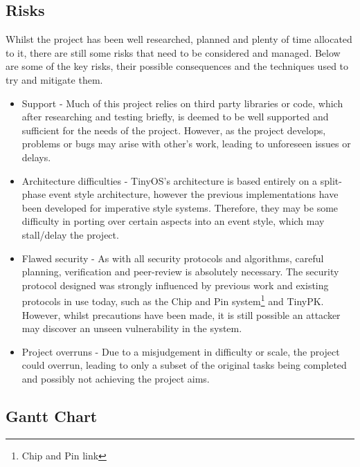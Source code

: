 \documentclass{mprop}
\begin{document}
\subsection{Risks} %
\label{sub:risks}
Whilst the project has been well researched, planned and plenty of time allocated to it, there are still some risks that need to be considered and managed. Below are some of the key risks, their possible consequences and the techniques used to try and mitigate them.
\begin{itemize}
  \item Support - Much of this project relies on third party libraries or code, which after researching and testing briefly, is deemed to be well supported and sufficient for the needs of the project. However, as the project develops, problems or bugs may arise with other's work, leading to unforeseen issues or delays.
  \item Architecture difficulties - TinyOS's architecture is based entirely on a split-phase event style architecture, however the previous implementations have been developed for imperative style systems. Therefore, they may be some difficulty in porting over certain aspects into an event style, which may stall/delay the project.
  \item Flawed security - As with all security protocols and algorithms, careful planning, verification and peer-review is absolutely necessary. The security protocol designed was strongly influenced by previous work and existing protocols in use today, such as the Chip and Pin system\footnote{Chip and Pin link} and TinyPK. However, whilst precautions have been made, it is still possible an attacker may discover an unseen vulnerability in the system. 
  \item Project overruns - Due to a misjudgement in difficulty or scale, the project could overrun, leading to only a subset of the original tasks being completed and possibly not achieving the project aims.
\end{itemize}

\subsection{Gantt Chart} %
\label{sub:gantt_chart}


\newpage


\end{document}

